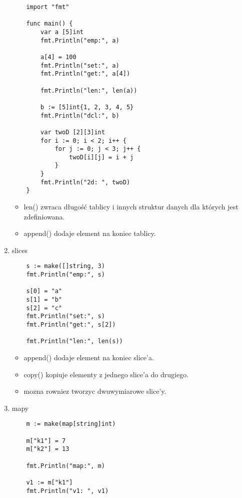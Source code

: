 \documentclass[11pt,a4paper]{article}
\begin{document}
\begin{enumerate}
\begin{verbatim}
    import "fmt"

    func main() {
        var a [5]int
        fmt.Println("emp:", a)

        a[4] = 100
        fmt.Println("set:", a)
        fmt.Println("get:", a[4])

        fmt.Println("len:", len(a))

        b := [5]int{1, 2, 3, 4, 5}
        fmt.Println("dcl:", b)

        var twoD [2][3]int
        for i := 0; i < 2; i++ {
            for j := 0; j < 3; j++ {
                twoD[i][j] = i + j
            }
        }
        fmt.Println("2d: ", twoD)
    }
    \end{verbatim}
    \begin{itemize}
    \item len() zwraca długość tablicy i innych struktur danych dla których jest zdefiniowana.
    \item append() dodaje element na koniec tablicy.
    \end{itemize}
\item slices \begin{verbatim}
    s := make([]string, 3)
    fmt.Println("emp:", s)

    s[0] = "a"
    s[1] = "b"
    s[2] = "c"
    fmt.Println("set:", s)
    fmt.Println("get:", s[2])

    fmt.Println("len:", len(s))
    \end{verbatim}
    \begin{itemize}
        \item append() dodaje element na koniec slice'a.
        \item copy() kopiuje elementy z jednego slice'a do drugiego.
        \item mozna rowniez tworzyc dwuwymiarowe slice'y.
    \end{itemize}
\item mapy \begin{verbatim}
    m := make(map[string]int)

    m["k1"] = 7
    m["k2"] = 13

    fmt.Println("map:", m)

    v1 := m["k1"]
    fmt.Println("v1: ", v1)


\end{verbatim}
\end{enumerate}
\end{document}
